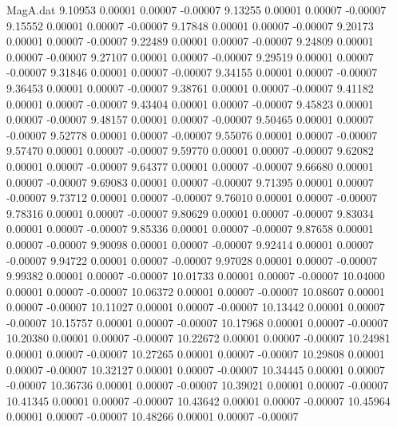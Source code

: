 \begin{filecontents}{MagA.dat}
   9.10953    0.00001    0.00007   -0.00007
   9.13255    0.00001    0.00007   -0.00007
   9.15552    0.00001    0.00007   -0.00007
   9.17848    0.00001    0.00007   -0.00007
   9.20173    0.00001    0.00007   -0.00007
   9.22489    0.00001    0.00007   -0.00007
   9.24809    0.00001    0.00007   -0.00007
   9.27107    0.00001    0.00007   -0.00007
   9.29519    0.00001    0.00007   -0.00007
   9.31846    0.00001    0.00007   -0.00007
   9.34155    0.00001    0.00007   -0.00007
   9.36453    0.00001    0.00007   -0.00007
   9.38761    0.00001    0.00007   -0.00007
   9.41182    0.00001    0.00007   -0.00007
   9.43404    0.00001    0.00007   -0.00007
   9.45823    0.00001    0.00007   -0.00007
   9.48157    0.00001    0.00007   -0.00007
   9.50465    0.00001    0.00007   -0.00007
   9.52778    0.00001    0.00007   -0.00007
   9.55076    0.00001    0.00007   -0.00007
   9.57470    0.00001    0.00007   -0.00007
   9.59770    0.00001    0.00007   -0.00007
   9.62082    0.00001    0.00007   -0.00007
   9.64377    0.00001    0.00007   -0.00007
   9.66680    0.00001    0.00007   -0.00007
   9.69083    0.00001    0.00007   -0.00007
   9.71395    0.00001    0.00007   -0.00007
   9.73712    0.00001    0.00007   -0.00007
   9.76010    0.00001    0.00007   -0.00007
   9.78316    0.00001    0.00007   -0.00007
   9.80629    0.00001    0.00007   -0.00007
   9.83034    0.00001    0.00007   -0.00007
   9.85336    0.00001    0.00007   -0.00007
   9.87658    0.00001    0.00007   -0.00007
   9.90098    0.00001    0.00007   -0.00007
   9.92414    0.00001    0.00007   -0.00007
   9.94722    0.00001    0.00007   -0.00007
   9.97028    0.00001    0.00007   -0.00007
   9.99382    0.00001    0.00007   -0.00007
  10.01733    0.00001    0.00007   -0.00007
  10.04000    0.00001    0.00007   -0.00007
  10.06372    0.00001    0.00007   -0.00007
  10.08607    0.00001    0.00007   -0.00007
  10.11027    0.00001    0.00007   -0.00007
  10.13442    0.00001    0.00007   -0.00007
  10.15757    0.00001    0.00007   -0.00007
  10.17968    0.00001    0.00007   -0.00007
  10.20380    0.00001    0.00007   -0.00007
  10.22672    0.00001    0.00007   -0.00007
  10.24981    0.00001    0.00007   -0.00007
  10.27265    0.00001    0.00007   -0.00007
  10.29808    0.00001    0.00007   -0.00007
  10.32127    0.00001    0.00007   -0.00007
  10.34445    0.00001    0.00007   -0.00007
  10.36736    0.00001    0.00007   -0.00007
  10.39021    0.00001    0.00007   -0.00007
  10.41345    0.00001    0.00007   -0.00007
  10.43642    0.00001    0.00007   -0.00007
  10.45964    0.00001    0.00007   -0.00007
  10.48266    0.00001    0.00007   -0.00007

\end{filecontents}
